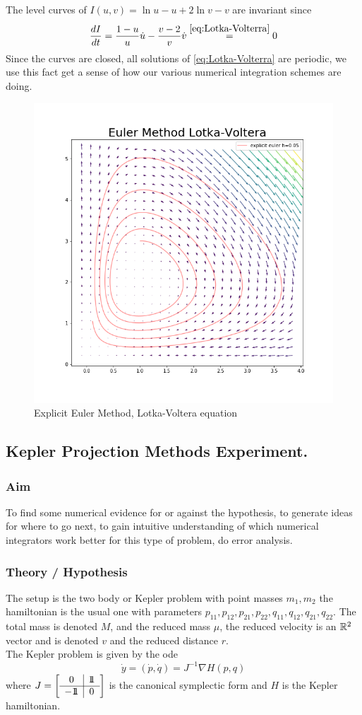 \documentclass[12pt]{article}
\begin{document}
The level curves of $I(u,v) = \ln u - u + 2\ln v - v$ are invariant since 
$$
\frac{dI}{dt} = \frac{1-u}{u}\dot u - \frac{v-2}{v}\dot v \stackrel{\eqref{eq:Lotka-Volterra}}{=} 0
$$
Since the curves are closed, all solutions of \eqref{eq:Lotka-Volterra} are periodic, we use this fact get a sense of how our various numerical integration schemes are doing. 

\begin{figure}[h!]
    \centering
    \includegraphics[width=0.3\linewidth]{Figures/explicit_euler_metod_lotka_voltera.png}
    \caption{Explicit Euler Method, Lotka-Voltera equation}
    \label{fig:Explicit Euler Lotka-Voltera}
\end{figure}



\subsection{Kepler Projection Methods Experiment.}
\subsubsection{Aim}
To find some numerical evidence for or against the hypothesis, to generate ideas for where to go next, to gain intuitive understanding of which numerical integrators work better for this type of problem, do error analysis. 

\subsubsection{Theory / Hypothesis}
The setup is the two body or Kepler problem with point masses $m_1,m_2$ the hamiltonian is the usual one with parameters $p_{11},p_{12},p_{21},p_{22},q_{11},q_{12},q_{21},q_{22}$. The total mass is denoted $M$, and the reduced mass $\mu$, the reduced velocity is an $\mathbb{R}^2$ vector and is denoted $v$ and the reduced distance $r$. \\

The Kepler problem is given by the ode
\begin{equation}\label{eq:ode kepler}
    \dot y = (\dot p,\dot q) = J^{-1}\nabla H(p,q)
\end{equation}
where $J = \left[\begin{array}{c|c}0&1\!\!1\\\hline-1\!\!1&0\end{array}\right]$ is the canonical symplectic form and $H$ is the Kepler hamiltonian.\\
\end{document}
